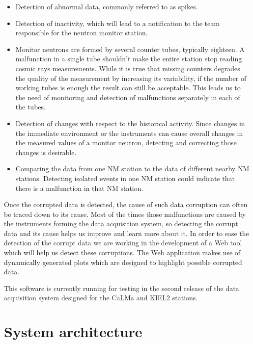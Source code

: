 \documentclass[a4paper]{jpconf}
\begin{document}
\begin{itemize}
	\item   Detection of abnormal data, commonly referred to as spikes.
    \item   Detection of inactivity, which will lead to a notification to the
        team responsible for the neutron monitor station.
    \item Monitor neutrons are formed by several counter tubes, typically
        eighteen. A malfunction in a single tube shouldn't make the entire
        station stop reading cosmic rays measurements. While it is true that
        missing counters degrades the quality of the measurement by increasing its
        variability, if the number of working tubes is enough the result can
        still be acceptable. This leads us to the need of monitoring and
        detection of malfunctions separately in each of the tubes.  
    \item Detection of changes with respect to the historical activity.
        Since changes in the immediate environment or the instruments can cause
        overall changes in the measured values of a monitor neutron, detecting
        and correcting those changes is desirable.
    \item Comparing the data from one NM station to the data of different
        nearby NM stations. Detecting isolated events in one NM station
        could indicate that there is a malfunction in that NM station.	
\end{itemize}

Once the corrupted data is detected, the cause of such data corruption can often 
be traced down to its cause. Most of the times those malfunctions are caused by the instruments
forming the data acquisition system, so detecting the corrupt data and its cause
helps us improve and learn more about it. In order
to ease the detection of the corrupt data we are working in the
development of a Web tool which will help us detect these corruptions. The Web
application makes use of dynamically generated plots which are designed to highlight
possible corrupted data.

This software is currently running for testing in the second release of the data
acquisition system\cite{Garcia2014} designed for the CaLMa\cite{Medina2013} and
KIEL2 stations.


\section{System architecture}
\end{document}
